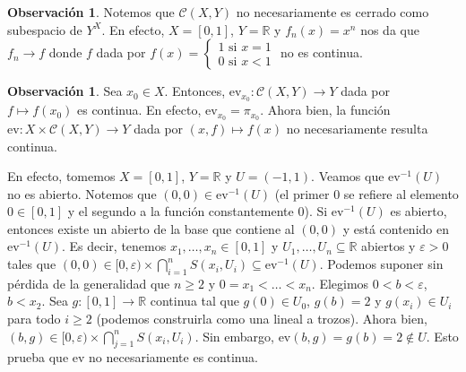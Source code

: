 \documentclass[12pt]{book}
\theoremstyle{definition}
\newtheorem{obs}[teo]{Observación}
\newcommand{\RR}{\mathbb{R}}      %
\begin{document}
\begin{obs}
Notemos que $\mathscr{C}(X,Y)$ no necesariamente es cerrado como subespacio de $Y^X$. En efecto, $X=[0,1]$, $Y=\RR$ y $f_n(x)=x^n$ nos da que $f_n\to f$ donde $f$ dada por $f(x) = \begin{cases}1 \text{ si }x=1 \\ 0\text{ si }x<1\end{cases}$ no es continua.
\end{obs}

\begin{obs}
Sea $x_0\in X$. Entonces, $\mathrm{ev}_{x_0}:\mathscr{C}(X,Y)\to Y$ dada por $f\mapsto f(x_0)$ es continua. En efecto, $\mathrm{ev}_{x_0} = \pi_{x_0}$. Ahora bien, la función $\mathrm{ev}:X\times \mathscr{C}(X,Y)\to Y$ dada por $(x,f)\mapsto f(x)$ no necesariamente resulta continua.

En efecto, tomemos $X=[0,1]$, $Y=\RR$ y $U=(-1,1)$. Veamos que $\mathrm{ev}^{-1}(U)$ no es abierto. Notemos que $(0,0)\in \mathrm{ev}^{-1}(U)$ (el primer $0$ se refiere al elemento $0\in [0,1]$ y el segundo a la función constantemente $0$). Si $\mathrm{ev}^{-1}(U)$ es abierto, entonces existe un abierto de la base que contiene al $(0,0)$ y está contenido en $\mathrm{ev}^{-1}(U)$. Es decir, tenemos $x_1,\ldots , x_n\in [0,1]$ y $U_1,\ldots , U_n\subseteq \RR$ abiertos y $\varepsilon>0$ tales que $(0,0) \in [0,\varepsilon)\times \displaystyle\bigcap_{i=1}^n S(x_i,U_i)\subseteq \mathrm{ev}^{-1}(U)$. Podemos suponer sin pérdida de la generalidad que $n\geq 2$ y $0=x_1<\ldots <x_n$. Elegimos $0<b<\varepsilon$, $b<x_2$. Sea $g:[0,1]\to\RR$ continua tal que $g(0)\in U_0$, $g(b)=2$ y $g(x_i)\in U_i$ para todo $i\geq 2$ (podemos construirla como una lineal a trozos). Ahora bien, $(b,g)\in [0,\varepsilon)\times\displaystyle\bigcap_{j=1}^n S(x_i,U_i)$. Sin embargo, $\mathrm{ev}(b,g) = g(b)=2\notin U$. Esto prueba que $\mathrm{ev}$ no necesariamente es continua.
\end{obs}
\end{document}
